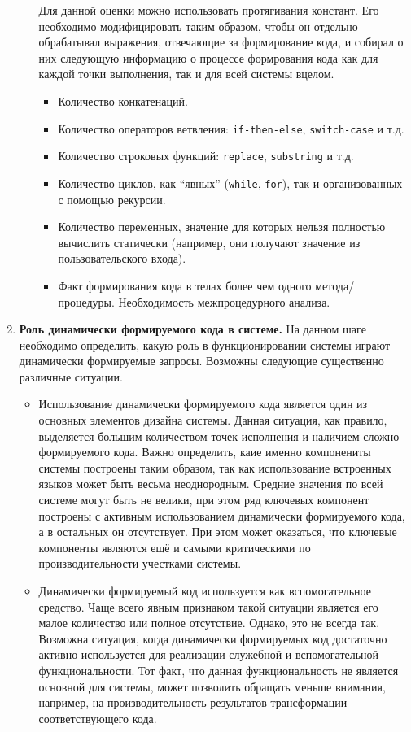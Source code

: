 \begin{enumerate}
\begin{itemize}
    Для данной оценки можно использовать протягивания констант. Его необходимо модифицировать таким образом, чтобы он отдельно обрабатывал выражения, отвечающие за формирование кода, и собирал о них следующую информацию о процессе формрования кода как для каждой точки выполнения, так и для всей системы вцелом.
    \begin{itemize}
      \item Количество конкатенаций.
      \item Количество операторов ветвления: \verb|if-then-else|, \verb|switсh-case| и т.д.
      \item Количество строковых функций: \verb|replace|, \verb|substring| и т.д.
      \item Количество циклов, как ``явных'' (\verb|while|, \verb|for|), так и организованных с помощью рекурсии.
      \item Количество переменных, значение для которых нельзя полностью вычислить статически (например, они получают значение из пользовательского входа).
      \item Факт формирования кода в телах более чем одного метода/процедуры. Необходимость межпроцедурного анализа.
    \end{itemize}
  \end{itemize}
  
  \item \textbf{Роль динамически формируемого кода в системе.} На данном шаге необходимо определить, какую роль в функционировании системы играют динамически формируемые запросы. Возможны следующие существенно различные ситуации.
  \begin{itemize}
    \item Использование динамически формируемого кода является один из основных элементов дизайна системы. Данная ситуация, как правило, выделяется большим количеством точек исполнения и наличием сложно формируемого кода. Важно определить, каие именно компонениты системы построены таким образом, так как использование встроенных языков может быть весьма неоднородным. Средние значения по всей системе могут быть не велики, при этом ряд ключевых компонент построены с активным использованием динамически формируемого кода, а в остальных он отсутствует. При этом может оказаться, что ключевые компоненты являются ещё и самыми критическими по производительности учестками системы.
    
    \item Динамически формируемый код используется как вспомогательное средство. Чаще всего явным признаком такой ситуации является его малое количество или полное отсутствие. Однако, это не всегда так. Возможна ситуация, когда динамически формируемых код достаточно активно используется для реализации служебной и вспомогательной функциональности. Тот факт, что данная функциональность не является основной для системы, может позволить обращать меньше внимания, например, на производительность результатов трансформации соответствующего кода.
  \end{itemize}
  

\end{enumerate}
